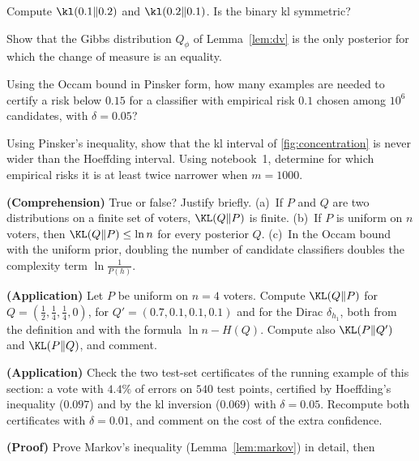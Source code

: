 \begin{exercises}
\begin{exercise}
Compute $\kl(0.1\|0.2)$ and $\kl(0.2\|0.1)$. Is the binary kl symmetric?
\end{exercise}
\begin{exercise}
Show that the Gibbs distribution $Q_\phi$ of Lemma~\ref{lem:dv} is the only posterior
for which the change of measure is an equality.
\end{exercise}
\begin{exercise}
Using the Occam bound in Pinsker form, how many examples are needed to certify a
risk below $0.15$ for a classifier with empirical risk $0.1$ chosen among $10^6$
candidates, with $\delta=0.05$?
\end{exercise}
\begin{exercise}
Using Pinsker's inequality, show that the kl interval of \cref{fig:concentration}
is never wider than the Hoeffding interval. Using notebook~1, determine for which
empirical risks it is at least twice narrower when $m=1000$.
\end{exercise}
\begin{exercise}
\textbf{(Comprehension)} True or false? Justify briefly. (a)~If $P$ and $Q$ are
two distributions on a finite set of voters, $\KL(Q\|P)$ is finite. (b)~If $P$ is
uniform on $n$ voters, then $\KL(Q\|P)\leq\ln n$ for every posterior $Q$.
(c)~In the Occam bound with the uniform prior, doubling the number of candidate
classifiers doubles the complexity term $\ln\frac1{P(h)}$.
\end{exercise}
\begin{exercise}
\textbf{(Application)} Let $P$ be uniform on $n=4$ voters. Compute $\KL(Q\|P)$
for $Q=(\frac12,\frac14,\frac14,0)$, for $Q'=(0.7,0.1,0.1,0.1)$ and for the Dirac
$\delta_{h_1}$, both from the definition and with the formula $\ln n-H(Q)$.
Compute also $\KL(P\|Q')$ and $\KL(P\|Q)$, and comment.
\end{exercise}
\begin{exercise}
\textbf{(Application)} Check the two test-set certificates of the running
example of this section: a vote with $4.4\%$ of errors on $540$ test points,
certified by Hoeffding's inequality ($0.097$) and by the kl inversion ($0.069$) with
$\delta=0.05$. Recompute both certificates with $\delta=0.01$, and comment on the
cost of the extra confidence.
\end{exercise}
\begin{exercise}
\textbf{(Proof)} Prove Markov's inequality (Lemma~\ref{lem:markov}) in detail, then

\end{exercise}
\end{exercises}
